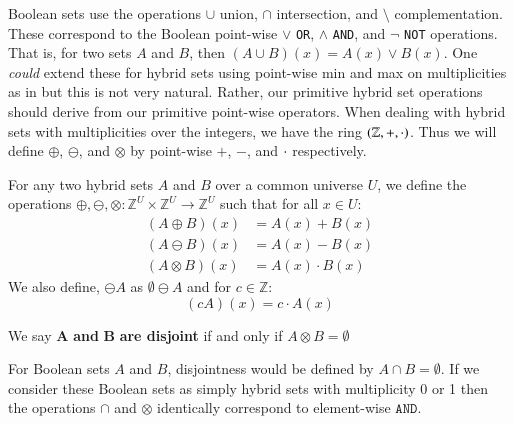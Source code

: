 Boolean sets use the operations $\cup$ union, $\cap$ intersection, and $\setminus$ complementation.
These correspond to the Boolean point-wise $\vee$ \texttt{OR}, $\wedge$ \texttt{AND}, and $\neg$ \texttt{NOT} 
operations. That is, for two sets $A$ and $B$, then $(A \cup B)(x) = A(x) \vee B(x)$.
One \emph{could} extend these for hybrid sets using point-wise min and max on multiplicities as in
\cite{blizard1988, blizard1990, girish2012multiset, singh2011complementation}
but this is not very natural.
Rather, our primitive hybrid set operations should derive from our primitive point-wise operators.
When dealing with hybrid sets with multiplicities over the integers, we have the ring $(\mathbb{Z}, +, \cdot)$.
Thus we will define $\oplus$, $\ominus$, and $\otimes$ by point-wise $+$, $-$, and $\cdot$ respectively.


\begin{definition}
	For any two hybrid sets $A$ and $B$ over a common universe $U$, 
	we define the operations $\oplus, \ominus, \otimes : \mathbb{Z}^U \times \mathbb{Z}^U \to \mathbb{Z}^U$ 
	such that for all $x \in U$:
	\begin{align}
		(A \oplus B)(x) 	&= A(x) + B(x) \\
		(A \ominus B)(x) 	&= A(x) - B(x) \\
		(A \otimes B)(x) 	&= A(x) \cdot B(x)
	\end{align}
	We also define, $\ominus A$ as $\emptyset \ominus A$ and for $c \in \mathbb{Z}$:
	\begin{equation}
		(cA)(x) = c \cdot A(x)
	\end{equation}
\end{definition}


\begin{definition}
	We say $\boldsymbol{A}$ \textbf{and} $\boldsymbol{B}$ \textbf{are disjoint} if and only if $A \otimes B = \emptyset$
\end{definition}
For Boolean sets $A$ and $B$, disjointness would be defined by $A \cap B = \emptyset$.
If we consider these Boolean sets as simply hybrid sets with multiplicity 0 or 1 then the operations $\cap$ and $\otimes$
identically correspond to element-wise $\texttt{AND}$.


